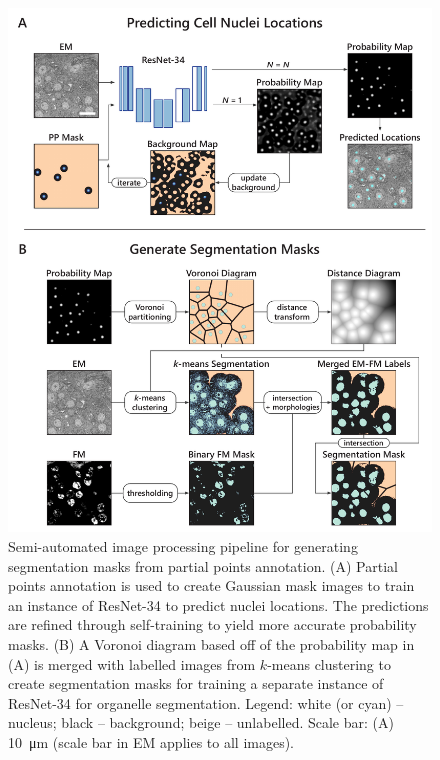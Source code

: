 \begin{figure}[!tb]
    \centering
    \includegraphics[width=0.95\linewidth]{chapter-4/figures_PDF/fig4-M5_segmentation.pdf}
    \caption{Semi-automated image processing pipeline for generating segmentation masks from partial points annotation.
    (A) Partial points annotation is used to create Gaussian mask images to train an instance of ResNet-34 to predict nuclei locations. The predictions are refined through self-training to yield more accurate probability masks.
    (B) A Voronoi diagram based off of the probability map in (A) is merged with labelled images from $k$-means clustering to create segmentation masks for training a separate instance of ResNet-34 for organelle segmentation.
    Legend: white (or cyan) -- nucleus; black -- background; beige -- unlabelled.
    Scale bar: (A) \SI{10}{\micro\meter} (scale bar in EM applies to all images).}
    \label{fig:5M_segmentation}
\end{figure}

